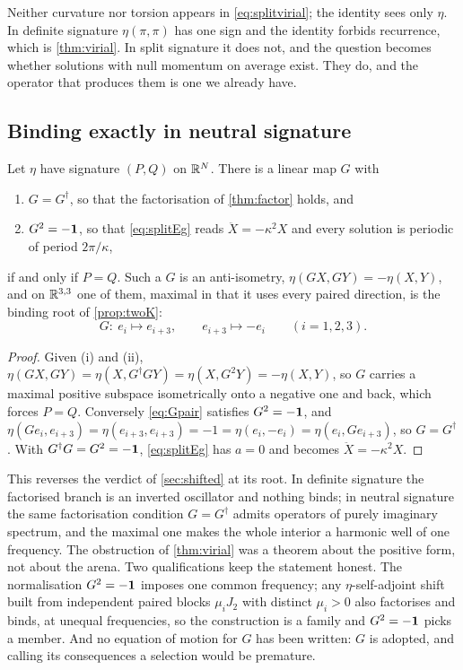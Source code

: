 Neither curvature nor torsion appears in \eqref{eq:splitvirial}; the identity sees only $\eta$. In definite signature $\eta(\pi,\pi)$ has
one sign and the identity forbids recurrence, which is \cref{thm:virial}. In split signature it does not, and the question becomes whether
solutions with null momentum on average exist. They do, and the operator that produces them is one we already have.

\subsection{Binding exactly in neutral signature}

\begin{theorem}
\label{thm:neutral}
Let $\eta$ have signature $(P,Q)$ on $\mathbb{R}^N$. There is a linear map $G$ with
\begin{enumerate}[label=(\roman*),leftmargin=2.2em]
\item $G=G^\dagger$, so that the factorisation of \cref{thm:factor} holds, and
\item $G^2=-\mathbf 1$, so that \eqref{eq:splitEg} reads $\ddot X=-\kappa^2X$ and every solution is periodic of period $2\pi/\kappa$,
\end{enumerate}
if and only if $P=Q$. Such a $G$ is an anti-isometry, $\eta(GX,GY)=-\eta(X,Y)$, and on $\mathbb{R}^{3,3}$ one of them, maximal in that it uses every
paired direction, is the binding root of \cref{prop:twoK}:
\begin{equation}
\label{eq:Gpair}
G:\ e_i\longmapsto e_{i+3},\qquad e_{i+3}\longmapsto-e_i\qquad(i=1,2,3).
\end{equation}
\end{theorem}

\begin{proof}
Given (i) and (ii), $\eta(GX,GY)=\eta(X,G^\dagger GY)=\eta(X,G^2Y)=-\eta(X,Y)$, so $G$ carries a maximal positive subspace isometrically onto a
negative one and back, which forces $P=Q$. Conversely \eqref{eq:Gpair} satisfies $G^2=-\mathbf 1$, and
$\eta(Ge_i,e_{i+3})=\eta(e_{i+3},e_{i+3})=-1=\eta(e_i,-e_i)=\eta(e_i,Ge_{i+3})$, so $G=G^\dagger$. With $G^\dagger G=G^2=-\mathbf 1$, \eqref{eq:splitEg}
has $a=0$ and becomes $\ddot X=-\kappa^2X$.
\end{proof}

This reverses the verdict of \cref{sec:shifted} at its root. In definite signature the factorised branch is an inverted oscillator and
nothing binds; in neutral signature the same factorisation condition $G=G^\dagger$ admits operators of purely imaginary spectrum, and the
maximal one makes the whole interior a harmonic well of one frequency. The obstruction of \cref{thm:virial} was a theorem about the
positive form, not about the arena. Two qualifications keep the statement honest. The normalisation $G^2=-\mathbf 1$ imposes one common
frequency; any $\eta$-self-adjoint shift built from independent paired blocks $\mu_iJ_2$ with distinct $\mu_i>0$ also factorises and binds, at
unequal frequencies, so the construction is a family and $G^2=-\mathbf 1$ picks a member. And no equation of motion for $G$ has been written:
$G$ is adopted, and calling its consequences a selection would be premature.

